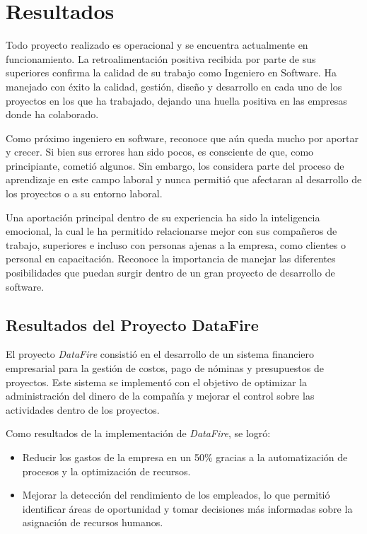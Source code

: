 \documentclass[protocolo.tex]{subfiles}
\begin{document}
\section{Resultados}
Todo proyecto realizado es operacional y se encuentra actualmente en funcionamiento. La retroalimentación positiva recibida por parte de sus superiores  confirma la calidad de su trabajo como Ingeniero en Software. Ha manejado con éxito la calidad, gestión, diseño y desarrollo en cada uno de los proyectos en los que ha trabajado, dejando una huella positiva en las empresas donde ha colaborado.\vspace{4mm}

Como próximo ingeniero en software, reconoce que aún queda mucho por aportar y crecer.  Si bien sus errores han sido pocos,  es consciente de que, como principiante,  cometió algunos.  Sin embargo,  los considera parte del proceso de aprendizaje en este campo laboral y  nunca permitió que afectaran al desarrollo de los proyectos o a su entorno laboral.\vspace{4mm}

Una aportación principal dentro de su experiencia ha sido la inteligencia emocional, la cual le ha permitido  relacionarse mejor con sus compañeros de trabajo, superiores e incluso con personas ajenas a la empresa, como clientes o personal en capacitación.  Reconoce la importancia de  manejar las diferentes  posibilidades que puedan surgir dentro de un gran proyecto de desarrollo de software.

\subsection{Resultados del Proyecto DataFire}

El proyecto \textit{DataFire} consistió en el desarrollo de un sistema financiero empresarial para la gestión de costos, pago de nóminas y presupuestos de proyectos. Este sistema se implementó con el objetivo de optimizar la administración del dinero de la compañía y mejorar el control sobre las actividades dentro de los proyectos.\vspace{4mm}

Como resultados de la implementación de \textit{DataFire}, se logró:

\begin{itemize}
\item Reducir los gastos de la empresa en un 50\% gracias a la automatización de procesos y la optimización de recursos.
\item Mejorar la detección del rendimiento de los empleados, lo que permitió identificar áreas de oportunidad y tomar decisiones más informadas sobre la asignación de recursos humanos.
\end{itemize}
\end{document}
